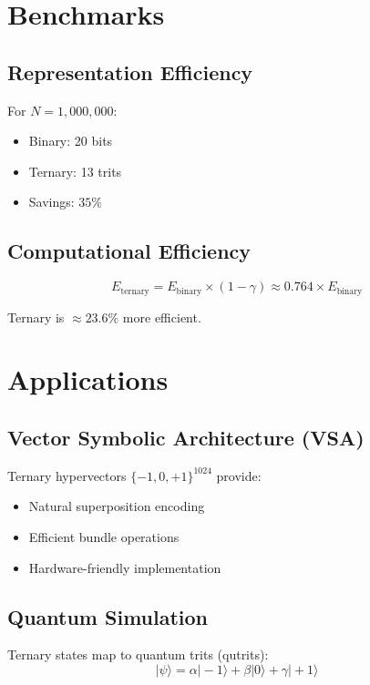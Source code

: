 \documentclass[12pt,a4paper]{article}
\begin{document}
\section{Benchmarks}

\subsection{Representation Efficiency}

For $N = 1,000,000$:
\begin{itemize}
\item Binary: 20 bits
\item Ternary: 13 trits
\item Savings: $35\%$
\end{itemize}

\subsection{Computational Efficiency}

\begin{equation}
E_{\text{ternary}} = E_{\text{binary}} \times (1 - \gamma) \approx 0.764 \times E_{\text{binary}}
\end{equation}

Ternary is $\approx 23.6\%$ more efficient.

\section{Applications}

\subsection{Vector Symbolic Architecture (VSA)}

Ternary hypervectors $\{-1, 0, +1\}^{1024}$ provide:
\begin{itemize}
\item Natural superposition encoding
\item Efficient bundle operations
\item Hardware-friendly implementation
\end{itemize}

\subsection{Quantum Simulation}

Ternary states map to quantum trits (qutrits):
\begin{equation}
|\psi\rangle = \alpha|-1\rangle + \beta|0\rangle + \gamma|+1\rangle
\end{equation}
\end{document}
